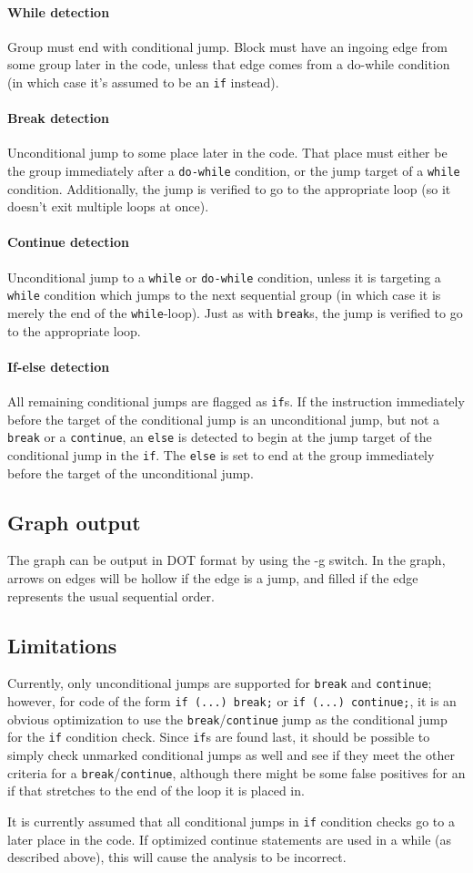 \paragraph{While detection}
Group must end with conditional jump. Block must have an ingoing edge from some group later in the code, unless that edge comes from a do-while condition (in which case it's assumed to be an \verb+if+ instead).

\paragraph{Break detection}
Unconditional jump to some place later in the code. That place must either be the group immediately after a \verb+do-while+ condition, or the jump target of a \verb+while+ condition. Additionally, the jump is verified to go to the appropriate loop (so it doesn't exit multiple loops at once).

\paragraph{Continue detection}
Unconditional jump to a \verb+while+ or \verb+do-while+ condition, unless it is targeting a \verb+while+ condition which jumps to the next sequential group (in which case it is merely the end of the \verb+while+-loop). Just as with \verb+break+s, the jump is verified to go to the appropriate loop.

\paragraph{If-else detection}
All remaining conditional jumps are flagged as \verb+if+s. If the instruction immediately before the target of the conditional jump is an unconditional jump, but not a \verb+break+ or a \verb+continue+, an \verb+else+ is detected to begin at the jump target of the conditional jump in the \verb+if+. The \verb+else+ is set to end at the group immediately before the target of the unconditional jump.

\subsection{Graph output}
The graph can be output in DOT format by using the -g switch. In the graph, arrows on edges will be hollow if the edge is a jump, and filled if the edge represents the usual sequential order.

\subsection{Limitations}
Currently, only unconditional jumps are supported for \verb+break+ and \verb+continue+; however, for code of the form \verb+if (...) break;+ or \verb+if (...) continue;+, it is an obvious optimization to use the \verb+break+/\verb+continue+ jump as the conditional jump for the \verb+if+ condition check. Since \verb+if+s are found last, it should be possible to simply check unmarked conditional jumps as well and see if they meet the other criteria for a \verb+break+/\verb+continue+, although there might be some false positives for an if that stretches to the end of the loop it is placed in.

It is currently assumed that all conditional jumps in \verb+if+ condition checks go to a later place in the code. If optimized continue statements are used in a while (as described above), this will cause the analysis to be incorrect.
